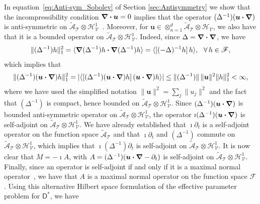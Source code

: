\documentclass[leqno,onefignum,onetabnum]{siamltex1213}
\newcommand{\Tc}{\mathcal{T}}
\newcommand{\Vc}{\mathcal{V}}
\newcommand{\Dm}{\mathsf{D}}
\newcommand{\Hs}{\mathscr{H}}
\newcommand{\As}{\mathscr{A}}
\newcommand{\Fs}{\mathscr{F}}
\newcommand\bnabla{\mbox{\boldmath${\nabla}$}}
\providecommand\bcdot{\boldsymbol{\cdot}}
\newcommand{\vecu}{\boldsymbol{u}}
\begin{document}
In equation~\eqref{eq:Anti-sym_Sobolev} of Section
\ref{sec:Antisymmetry} we show that the incompressibility condition
$\bnabla \bcdot\vecu =0$ implies that the operator
$(\Delta^{-1})(\vecu \bcdot\bnabla )$ is anti-symmetric on
$\tilde{\As}_{\Tc}\otimes\Hs^1_{\Vc}$~\cite{Bhattacharya:AAP:1999:951}.
Moreover, for $\vecu \in\otimes_{n=1}^d\tilde{\As}_{\Tc}\otimes\Hs_{\Vc}$, we also have that 
it is a bounded operator on $\tilde{\As}_{\Tc}\otimes\Hs^1_{\Vc}$. Indeed,
since $\Delta=\bnabla \bcdot\bnabla $, we have 
%
\begin{align}\label{eq:H1_L2}
  \|(\Delta^{-1})h\|_1^2=\langle\bnabla (\Delta^{-1})h\bcdot\bnabla (\Delta^{-1})h\rangle=\langle[(-\Delta)^{-1}h]\,h\rangle,
  \ \ \forall \,h\in\Fs,
\end{align}
%
which implies that
%
\begin{align}\label{eq:Bounded_A_Sobolov}
  \|(\Delta^{-1})(\vecu \bcdot\bnabla )h\|_1^2
    =|\langle[(\Delta^{-1})(\vecu \bcdot\bnabla )h]\, (\vecu \bcdot\bnabla )h \rangle|
   \leq\|(\Delta^{-1})\|\,\|\vecu \|^2\|h\|_1^2
   <\infty,
\end{align}
%
where we have used the simplified notation $\|\vecu \|^2=\sum_j\|u_j\|^2$
and the fact~\cite{Stakgold:BVP:2000} that $(\Delta^{-1})$ is compact,
hence bounded on $\tilde{\As}_{\Tc}\otimes\Hs^1_{\Vc}$. Since
$(\Delta^{-1})(\vecu \bcdot\bnabla )$ is bounded anti-symmetric operator on
$\tilde{\As}_{\Tc}\otimes\Hs^1_{\Vc}$, the operator
$\imath(\Delta^{-1})(\vecu \bcdot\bnabla )$ is self-adjoint on
$\tilde{\As}_{\Tc}\otimes\Hs^1_{\Vc}$. We have already
established that $\imath\partial_t$ is a self-adjoint operator on the function
space $\tilde{\As}_{\Tc}$ and that $\imath\partial_t$ and $(\Delta^{-1})$ commute on
$\tilde{\As}_{\Tc}\otimes\Hs^1_{\Vc}$, which implies that $\imath(\Delta^{-1})\partial_t$ is
self-adjoint on $\tilde{\As}_{\Tc}\otimes\Hs^1_{\Vc}$. It is now clear that
$M=-\imath A$, with $A=(\Delta^{-1})(\vecu \bcdot\bnabla -\partial_t)$ is self-adjoint on
$\tilde{\As}_{\Tc}\otimes\Hs^1_{\Vc}$. Finally, since an operator is
self-adjoint if and only if it is a maximal normal
operator~\cite{Stone:64}, we have that $A$ is a maximal normal
operator on 
the function space $\Fs$. Using this alternative Hilbert space
formulation of the effective parameter problem for $\Dm^*$, we have
\end{document}
